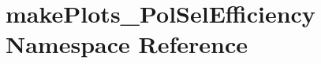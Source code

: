 \hypertarget{namespacemakePlots__PolSelEfficiency}{
\section{makePlots\_\-PolSelEfficiency Namespace Reference}
\label{namespacemakePlots__PolSelEfficiency}
}
